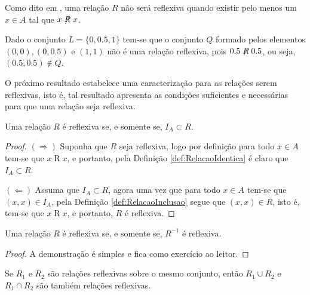 Como dito em \cite{abe1991-TC}, uma relação $R$ não será reflexiva quando existir pelo menos um $x \in A$ tal que $x\centernot{R} x$.

\begin{example}
	Dado o conjunto $L = \{0, 0.5, 1\}$ tem-se que o conjunto $Q$ formado pelos elementos $(0,0), (0,0.5)$ e $(1, 1)$ não é uma relação reflexiva, pois $0.5\centernot{R} 0.5$, ou seja, $(0.5, 0.5) \notin Q$.
\end{example}

O próximo resultado estabelece uma caracterização para as relações serem reflexivas, isto é, tal resultado apresenta as condições suficientes e necessárias para que uma relação seja reflexiva.

\begin{theorem}\label{teo:CaracterizacaoRelacaoReflexivda}
	Uma relação $R$ é reflexiva se, e somente se, $I_A \subset R$.
\end{theorem}

\begin{proof}
	$(\Rightarrow)$ Suponha que $R$ seja reflexiva, logo por definição para todo $x \in A$ tem-se que $x \mathrel{R} x$, e portanto, pela Definição \ref{def:RelacaoIdentica} é claro que $I_A \subset R$.
	
	$(\Leftarrow)$ Assuma que $I_A \subset R$, agora uma vez que para todo $x \in A$ tem-se que $(x, x) \in I_A$, pela Definição \ref{def:RelacaoInclusao} segue que $(x, x) \in R$, isto é, tem-se que $x \mathrel{R} x$, e portanto, $R$ é reflexiva.
\end{proof}

\begin{corollary}\label{col:CaracterizacaoRelacaoReflexivda}
	Uma relação $R$ é reflexiva se, e somente se, $R^{-1}$ é reflexiva.
\end{corollary}

\begin{proof}
	A demonstração é simples e fica como exercício ao leitor.
\end{proof}

\begin{theorem}\label{teo:FechoAlgebricoRelacoesReflexivas}
	Se $R_1$ e $R_2$ são relações reflexivas sobre o mesmo conjunto, então $R_1 \cup R_2$ e $R_1 \cap R_2$ são também relações reflexivas.
\end{theorem}

